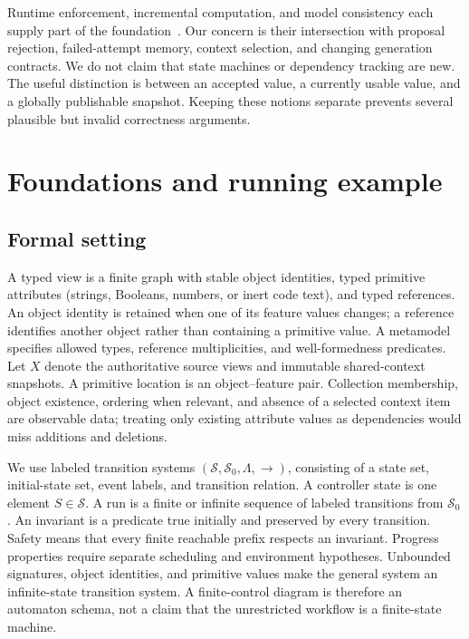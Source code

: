 \documentclass[pdflatex,sn-mathphys-num]{sn-jnl}
\theoremstyle{thmstyleone}
\theoremstyle{thmstylethree}
\theoremstyle{thmstyletwo}
\begin{document}
Runtime enforcement, incremental computation, and model consistency each supply part of the foundation~\cite{schneider,acar,mokhov,stevens}. Our concern is their intersection with proposal rejection, failed-attempt memory, context selection, and changing generation contracts. We do not claim that state machines or dependency tracking are new. The useful distinction is between an accepted value, a currently usable value, and a globally publishable snapshot. Keeping these notions separate prevents several plausible but invalid correctness arguments.

\section{Foundations and running example}\label{sec:found}
\subsection{Formal setting}
A typed view is a finite graph with stable object identities, typed primitive attributes (strings, Booleans, numbers, or inert code text), and typed references. An object identity is retained when one of its feature values changes; a reference identifies another object rather than containing a primitive value. A metamodel specifies allowed types, reference multiplicities, and well-formedness predicates. Let $X$ denote the authoritative source views and immutable shared-context snapshots. A primitive location is an object--feature pair. Collection membership, object existence, ordering when relevant, and absence of a selected context item are observable data; treating only existing attribute values as dependencies would miss additions and deletions.

We use labeled transition systems $(\mathcal S,\mathcal S_0,\Lambda,\longrightarrow)$, consisting of a state set, initial-state set, event labels, and transition relation. A controller state is one element $S\in\mathcal S$. A run is a finite or infinite sequence of labeled transitions from $\mathcal S_0$. An invariant is a predicate true initially and preserved by every transition. Safety means that every finite reachable prefix respects an invariant. Progress properties require separate scheduling and environment hypotheses. Unbounded signatures, object identities, and primitive values make the general system an infinite-state transition system. A finite-control diagram is therefore an automaton schema, not a claim that the unrestricted workflow is a finite-state machine.
\end{document}
